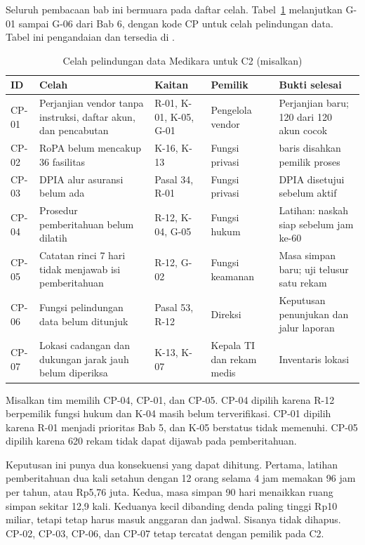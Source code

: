 Seluruh pembacaan bab ini bermuara pada daftar celah. Tabel~\ref{tab:ch07-celah} melanjutkan G-01
sampai G-06 dari Bab 6, dengan kode CP untuk celah pelindungan data. Tabel ini pengandaian dan
tersedia di .

\begin{table}[!htb]
  \centering\small
  \caption{Celah pelindungan data Medikara untuk C2 (misalkan)}\label{tab:ch07-celah}
  \begin{tabularx}{\textwidth}{|>{\raggedright\arraybackslash}p{}|>{\raggedright\arraybackslash}X|>{\raggedright\arraybackslash}p{}|>{\raggedright\arraybackslash}p{}|>{\raggedright\arraybackslash}X|}
    \hline
    \textbf{ID} & \textbf{Celah} & \textbf{Kaitan} & \textbf{Pemilik} & \textbf{Bukti selesai} \\
    \hline
    CP-01 & Perjanjian vendor tanpa instruksi, daftar akun, dan pencabutan & R-01, K-01, K-05,
    G-01 & Pengelola vendor & Perjanjian baru; 120 dari 120 akun cocok \\ \hline
    CP-02 & RoPA belum mencakup 36 fasilitas & K-16, K-13 & Fungsi privasi & 28 baris disahkan
    pemilik proses \\ \hline
    CP-03 & DPIA alur asuransi belum ada & Pasal 34, R-01 & Fungsi privasi & DPIA disetujui sebelum
    aktif \\ \hline
    CP-04 & Prosedur pemberitahuan belum dilatih & R-12, K-04, G-05 & Fungsi hukum & Latihan: naskah
    siap sebelum jam ke-60 \\ \hline
    CP-05 & Catatan rinci 7 hari tidak menjawab isi pemberitahuan & R-12, G-02 & Fungsi keamanan &
    Masa simpan baru; uji telusur satu rekam \\ \hline
    CP-06 & Fungsi pelindungan data belum ditunjuk & Pasal 53, R-12 & Direksi & Keputusan penunjukan
    dan jalur laporan \\ \hline
    CP-07 & Lokasi cadangan dan dukungan jarak jauh belum diperiksa & K-13, K-07 & Kepala TI dan
    rekam medis & Inventaris lokasi \\ \hline
  \end{tabularx}
\end{table}

\begin{kasus}[title={Kasus Medikara Health: Tiga Celah untuk C3}]
Misalkan tim memilih CP-04, CP-01, dan CP-05. CP-04 dipilih karena R-12 berpemilik fungsi hukum dan
K-04 masih belum terverifikasi. CP-01 dipilih karena R-01 menjadi prioritas Bab 5, dan K-05
berstatus tidak memenuhi. CP-05 dipilih karena 620 rekam tidak dapat dijawab pada pemberitahuan.

Keputusan ini punya dua konsekuensi yang dapat dihitung. Pertama, latihan pemberitahuan dua kali
setahun dengan 12 orang selama 4 jam memakan 96 jam per tahun, atau Rp5,76 juta. Kedua, masa simpan
90 hari menaikkan ruang simpan sekitar 12,9 kali. Keduanya kecil dibanding denda paling tinggi Rp10
miliar, tetapi tetap harus masuk anggaran dan jadwal. Sisanya tidak dihapus. CP-02, CP-03, CP-06,
dan CP-07 tetap tercatat dengan pemilik pada C2.
\end{kasus}

